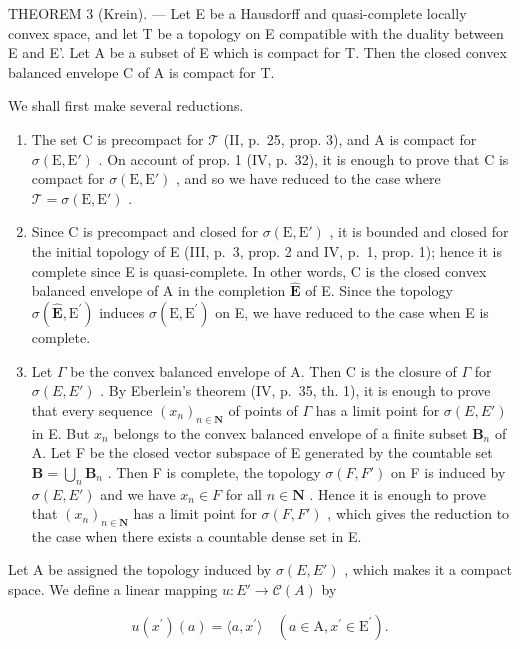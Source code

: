 THEOREM 3 (Krein). --- Let E be a Hausdorff and quasi-complete locally convex space, and let T be a topology on E compatible with the duality between E and E'. Let A be a subset of E which is compact for T. Then the closed convex balanced envelope C of A is compact for T.

We shall first make several reductions.

\begin{enumerate}
\def\labelenumi{\Alph{enumi})}
\item
  The set C is precompact for \(\mathcal{T}\) (II, p.~25, prop. 3), and A is compact for \(\sigma(\mathrm{E}, \mathrm{E}')\) . On account of prop. 1 (IV, p.~32), it is enough to prove that C is compact for \(\sigma(\mathrm{E}, \mathrm{E}')\) , and so we have reduced to the case where \(\mathcal{T} = \sigma(\mathrm{E}, \mathrm{E}')\) .
\item
  Since C is precompact and closed for \(\sigma(\mathrm{E}, \mathrm{E}')\) , it is bounded and closed for the initial topology of E (III, p.~3, prop. 2 and IV, p.~1, prop. 1); hence it is complete since E is quasi-complete. In other words, C is the closed convex balanced envelope of A in the completion \(\hat{\mathbf{E}}\) of E. Since the topology \(\sigma (\hat{\mathbf{E}},\mathrm{E}^{\prime})\) induces \(\sigma (\mathrm{E},\mathrm{E}^{\prime})\) on E, we have reduced to the case when E is complete.
\item
  Let \(\Gamma\) be the convex balanced envelope of A. Then C is the closure of \(\Gamma\) for \(\sigma(E, E')\) . By Eberlein's theorem (IV, p.~35, th. 1), it is enough to prove that every sequence \((x_n)_{n \in \mathbf{N}}\) of points of \(\Gamma\) has a limit point for \(\sigma(E, E')\) in E. But \(x_n\) belongs to the convex balanced envelope of a finite subset \(\mathbf{B}_n\) of A. Let F be the closed vector subspace of E generated by the countable set \(\mathbf{B} = \bigcup_{n} \mathbf{B}_n\) . Then F is complete, the topology \(\sigma(F, F')\) on F is induced by \(\sigma(E, E')\) and we have \(x_n \in F\) for all \(n \in \mathbf{N}\) . Hence it is enough to prove that \((x_n)_{n \in \mathbf{N}}\) has a limit point for \(\sigma(F, F')\) , which gives the reduction to the case when there exists a countable dense set in E.
\end{enumerate}

Let A be assigned the topology induced by \(\sigma(E, E')\) , which makes it a compact space. We define a linear mapping \(u: E' \to \mathcal{C}(A)\) by

\[
u (x ^ {\prime}) (a) = \langle a, x ^ {\prime} \rangle \quad (a \in \mathrm{A}, x ^ {\prime} \in \mathrm{E} ^ {\prime}).\tag{7}
\]

